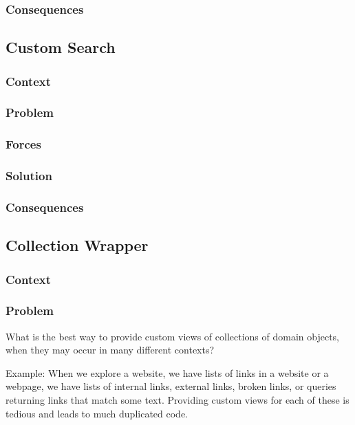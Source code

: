 \documentclass[sigconf]{acmart}
\begin{document}
\subsubsection*{Consequences}

\subsection*{Custom Search}\label{pat:customSearch}
\subsubsection*{Context}
\subsubsection*{Problem}
\subsubsection*{Forces}
\subsubsection*{Solution}
\subsubsection*{Consequences}

\subsection*{Collection Wrapper}\label{pat:collectionWrapper}
\subsubsection*{Context}
\subsubsection*{Problem}

What is the best way to provide custom views of collections of domain objects, when they may occur in many different contexts?

Example:
When we explore a website, we have lists of links in a website or a webpage, we have lists of internal links, external links, broken links, or queries returning links that match some text. Providing custom views for each of these is tedious and leads to much duplicated code.
\end{document}
